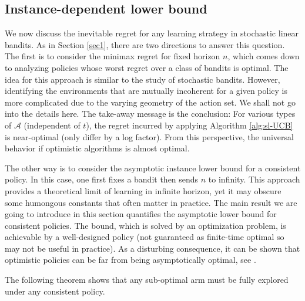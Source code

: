 \documentclass[10pt,a4article]{article}
\numberwithin{equation}{section}
\theoremstyle{plain}
\theoremstyle{definition}
\begin{document}
\subsection{Instance-dependent lower bound}
We now discuss the inevitable regret for any learning strategy in stochastic linear bandits. As in Section \ref{sec1}, there are two directions to answer this question.  The first is to consider the minimax regret for fixed horizon $n$, which comes down to analyzing policies whose worst regret over a class of bandits is optimal. The idea for this approach is similar to the study of stochastic bandits. However, identifying the environments that are mutually incoherent for a given policy is more complicated due to the varying geometry of the action set. We shall not go into the details here. The take-away message is the conclusion: For various types of $\mathcal A$ (independent of $t$), the regret incurred by applying Algorithm \ref{alg:sl-UCB} is near-optimal (only differ by a log factor). From this perspective, the universal behavior if optimistic algorithms is almost optimal. 

The other way is to consider the asymptotic instance lower bound for a consistent policy.  In this case, one first fixes a bandit then sends $n$ to infinity. This approach provides a theoretical limit of learning in infinite horizon, yet it may obscure some humongous constants that often matter in practice. The main result we are going to introduce in this section quantifies the asymptotic lower bound for consistent policies. The bound, which is solved by an optimization problem, is achievable by a well-designed policy (not guaranteed as finite-time optimal so may not be useful in practice).  As a disturbing consequence, it can be shown that optimistic policies can be far from being asymptotically optimal, see \cite{lattimore2016end}. 

The following theorem shows that any sub-optimal arm must be fully explored under any consistent policy. 
\end{document}
